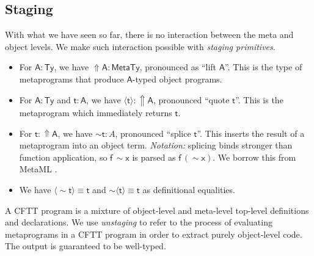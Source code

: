 \documentclass[acmsmall,screen,review,anonymous]{acmart}
\newcommand{\msf}[1]{{\mathsf{#1}}}
\newcommand{\bs}[1]{\boldsymbol{#1}}
\newcommand{\vA}{\mathsf{A}}
\newcommand{\vx}{\mathsf{x}}
\newcommand{\vf}{\mathsf{f}}
\newcommand{\vt}{\mathsf{t}}
\newcommand{\Lift}{{\Uparrow}}
\newcommand{\spl}{{\bs{\sim}}}
\newcommand{\ql}{{\bs{\langle}}}
\newcommand{\qr}{{\bs{\rangle}}}
\newcommand{\MTy}{\msf{MetaTy}}
\newcommand{\Ty}{\msf{Ty}}
\theoremstyle{remark}
\begin{document}

\subsection{Staging}\label{sec:staging}

With what we have seen so far, there is no interaction between the meta and
object levels. We make such interaction possible with \emph{staging primitives}.

\begin{itemize}
\item For $\vA : \Ty$, we have $\Lift \vA : \MTy$, pronounced as ``lift $\vA$''. This is
      the type of metaprograms that produce $\vA$-typed object programs.
\item For $\vA : \Ty$ and $\vt : \vA$, we have $\ql \vt \qr : \Lift \vA$, pronounced ``quote $\vt$''. This
      is the metaprogram which immediately returns $\vt$.
\item For $\vt : \Lift \vA$, we have $\spl \vt : A$, pronounced ``splice
  $\vt$''. This inserts the result of a metaprogram into an object
  term. \emph{Notation:} splicing binds stronger than function application, so
  $\vf\,\spl \vx$ is parsed as $\vf\,(\spl \vx)$. We borrow this from
  MetaML \cite{metaml}.
\item We have $\ql \spl \vt \qr \equiv \vt$ and $\spl \ql \vt \qr \equiv \vt$ as definitional equalities.
\end{itemize}

A CFTT program is a mixture of object-level and meta-level top-level definitions
and declarations. We use \emph{unstaging} to refer to the process of evaluating
metaprograms in a CFTT program in order to extract purely object-level code.
The output is guaranteed to be well-typed.
\end{document}
